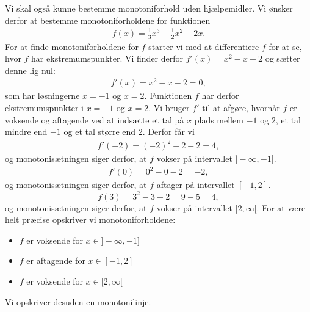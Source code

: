\begin{exa}
Vi skal også kunne bestemme monotoniforhold uden hjælpemidler. Vi ønsker derfor at bestemme monotoniforholdene for funktionen 
\begin{align*}
	f(x) = \frac{1}{3}x^3-\frac{1}{2}x^2-2x.
\end{align*}
For at finde monotoniforholdene for $f$ starter vi med at differentiere $f$ for at se, hvor $f$ har ekstremumspunkter. Vi finder derfor $f'(x) = x^2-x-2$ og sætter denne lig nul:
\begin{align*}
f'(x)=x^2-x-2 = 0,
\end{align*}
som har løsningerne $x=-1$ og $x=2$. Funktionen $f$ har derfor ekstremumspunkter i $x=-1$ og $x=2$. Vi bruger $f'$ til at afgøre, hvornår $f$ er voksende og aftagende ved at indsætte et tal på $x$ plads mellem $-1$ og $2$, et tal mindre end $-1$ og et tal større end $2$. Derfor får vi
\begin{align*}
f'(-2) = (-2)^2+2-2 = 4, 
\end{align*} 
og monotonisætningen siger derfor, at $f$ vokser på intervallet $]-\infty,-1]$. 
\begin{align*}
f'(0) = 0^2-0-2 = -2,
\end{align*}
og monotonisætningen siger derfor, at $f$ aftager på intervallet $[-1,2]$.
\[ 
f(3) = 3^2-3-2 = 9-5=4,
\]
og monotonisætningen siger derfor, at $f$ vokser på intervallet $[2,\infty[.$
For at være helt præcise opskriver vi monotoniforholdene:
\newpage
\begin{itemize}
	\item[$\cdot$] $f$ er voksende for $x \in ]-\infty,-1]$
	\item[$\cdot$] $f$ er aftagende for $x \in [-1,2]$
	\item[$\cdot$] $f$ er voksende for $x \in [2,\infty[$
\end{itemize}
Vi opskriver desuden en monotonilinje.
\begin{center}
\end{center}
\end{exa}

